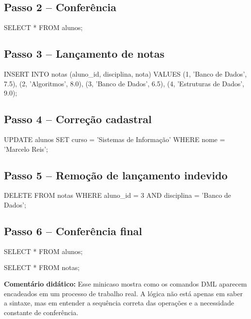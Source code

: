 \subsection*{Passo 2 -- Conferência}

\begin{sqlcode}
SELECT *
FROM alunos;
\end{sqlcode}

\subsection*{Passo 3 -- Lançamento de notas}

\begin{sqlcode}
INSERT INTO notas (aluno_id, disciplina, nota) VALUES
(1, 'Banco de Dados', 7.5),
(2, 'Algoritmos', 8.0),
(3, 'Banco de Dados', 6.5),
(4, 'Estruturas de Dados', 9.0);
\end{sqlcode}

\subsection*{Passo 4 -- Correção cadastral}

\begin{sqlcode}
UPDATE alunos
SET curso = 'Sistemas de Informação'
WHERE nome = 'Marcelo Reis';
\end{sqlcode}

\subsection*{Passo 5 -- Remoção de lançamento indevido}

\begin{sqlcode}
DELETE FROM notas
WHERE aluno_id = 3
  AND disciplina = 'Banco de Dados';
\end{sqlcode}

\subsection*{Passo 6 -- Conferência final}

\begin{sqlcode}
SELECT *
FROM alunos;
\end{sqlcode}

\begin{sqlcode}
SELECT *
FROM notas;
\end{sqlcode}

\textbf{Comentário didático:}  
Esse minicaso mostra como os comandos DML aparecem encadeados em um processo de trabalho real. A lógica não está apenas em saber a sintaxe, mas em entender a sequência correta das operações e a necessidade constante de conferência.

